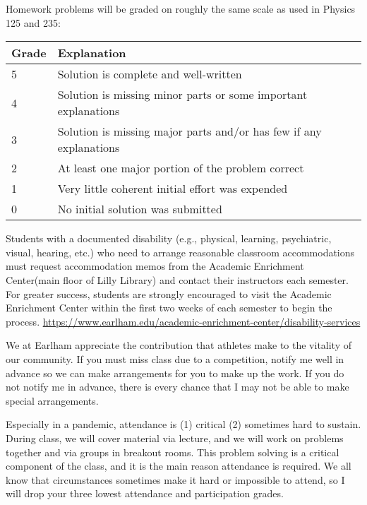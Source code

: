 \documentclass[12pt]{article}
\begin{document}
{\begin{description}
        Homework problems will be graded on roughly the same scale as used in
        Physics 125 and 235:
\setlength{\arrayrulewidth}{1mm}
\setlength{\tabcolsep}{8pt}
{
\begin{table}[H]
\label{tab:standard-grading-rubric-table}
\begin{tabular}{ll}
\hline
 \textbf{Grade} & \textbf{Explanation}       \\ \hline
  5 & Solution is complete and well-written\\
  4 & Solution is missing minor parts or some important explanations\\
  3 & Solution is missing major parts and/or has few if any explanations\\
  2 & At least one major portion of the problem correct\\
  1 & Very little coherent initial effort was expended\\
  0 & No initial solution was submitted\\
\end{tabular}
\end{table}
        }

  \item[Academic Accommodations:] 
        Students with a documented disability (e.g., physical,
        learning, psychiatric, visual, hearing, etc.) who need to
        arrange reasonable classroom accommodations must request
        accommodation memos from the Academic Enrichment Center(main
        floor of Lilly Library) and contact their  instructors each
        semester. For greater success, students are strongly
        encouraged to visit the Academic Enrichment Center within the
        first two weeks of each semester to begin the process.
        {\small
        \url{https://www.earlham.edu/academic-enrichment-center/disability-services}}


        We at Earlham appreciate the contribution that athletes make
        to the vitality of our community. If you must miss class due
        to a competition, notify me well in advance so we can make
        arrangements for you to make up the work. If you do not notify
        me in advance, there is every chance that I may not be able to
        make special arrangements.

  \item[Attendance/preparation/participation (including Piazza):]
        Especially in a pandemic, attendance is (1) critical (2)
        sometimes hard to sustain. During class, we will cover
        material via lecture, and we will work on problems together and via groups in breakout rooms. This
        problem solving is a critical component of the class, and it is the main reason
        attendance is required. We all know that circumstances
        sometimes make it hard or impossible to attend, so I will drop
        your three lowest attendance and participation grades.


\end{description}}
\end{document}
